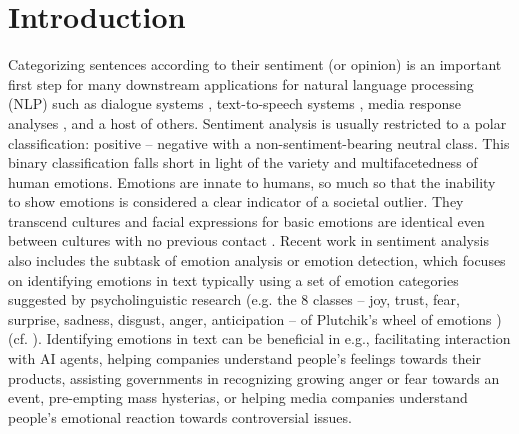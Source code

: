 
\chapter{Introduction} %

\label{ch:introduction} %


Categorizing sentences according to their sentiment (or opinion) is an important first step for many downstream applications for natural language processing (NLP) such as dialogue systems \cite{dialogue_systems}, text-to-speech systems \cite{text-to-speech}, media response analyses \cite{media_response_analysis}, and a host of others. Sentiment analysis is usually restricted to a polar classification: positive -- negative with a non-sentiment-bearing neutral class. This binary classification falls short in light of the variety and multifacetedness of human emotions. Emotions are innate to humans, so much so that the inability to show emotions is considered a clear indicator of a societal outlier. They transcend cultures and facial expressions for basic emotions are identical even between cultures with no previous contact \cite{facial_expressions}.
Recent work in sentiment analysis also includes the subtask of emotion analysis or emotion detection, which focuses on identifying emotions in text typically using a set of emotion categories suggested by psycholinguistic research (e.g. the 8 classes -- joy, trust, fear, surprise, sadness, disgust, anger, anticipation -- of Plutchik's wheel of emotions \cite{plutchik}) (cf. \cite{nrc}). Identifying emotions in text can be beneficial in e.g., facilitating interaction with AI agents, helping companies understand people's feelings towards their products, assisting governments in recognizing growing anger or fear towards an event, pre-empting mass hysterias, or helping media companies understand people's emotional reaction towards controversial issues.


